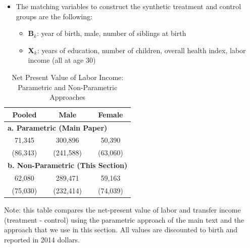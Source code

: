 \documentclass[static]{JJH-Beamer}
\begin{document}
\begin{frame}
 \addtocounter{framenumber}{-1}

\begin{itemize}
\item The matching variables to construct the synthetic treatment and control groups are the following:
    \begin{itemize}
    \item $\bm{B}_k$: year of birth, male, number of siblings at birth
    \item $\bm{X}_k$: years of education, number of children, overall health index, labor income (all at age 30)
    \end{itemize}
\end{itemize}

\end{frame}

\begin{frame}
 \addtocounter{framenumber}{-1}

\begin{table}[H]
\caption{Net Present Value of Labor Income: Parametric and Non-Parametric Approaches}\label{table:nvpli}
\begin{center}
\begin{tabular}{ccc}
\toprule
Pooled & Male & Female   \\
\midrule
\multicolumn{3}{l}{\textbf{a. Parametric (Main Paper)}} \\
71,345 & 300,896 & 50,390 \\
(86,343) & (241,588) & (63,060)\\
\multicolumn{3}{l}{\textbf{b. Non-Parametric (This Section)}} \\
62,080 & 289,471 & 59,163 \\
(75,030) & (232,414) & (74,039) \\
\bottomrule
\end{tabular}
\end{center}
\footnotesize \flushleft
Note: this table compares the net-present value of labor and transfer income (treatment - control) using the parametric approach of the main text and the approach that we use in this section. All values are discounted to birth and reported in 2014 dollars.\\
\end{table}

\end{frame}
\end{document}
